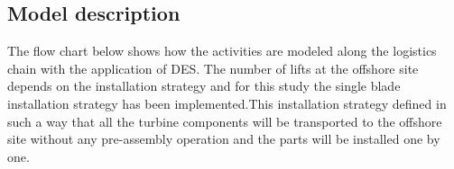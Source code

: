 \subsection{Model description}
The flow chart below shows  how the activities are modeled along the logistics chain with the application of DES.  The number of lifts at the offshore site depends on the installation strategy and for this study the single blade installation strategy has been implemented.This installation strategy defined in such a way that all the turbine components will be transported to the offshore site without any pre-assembly operation and the parts will be installed one by one.  